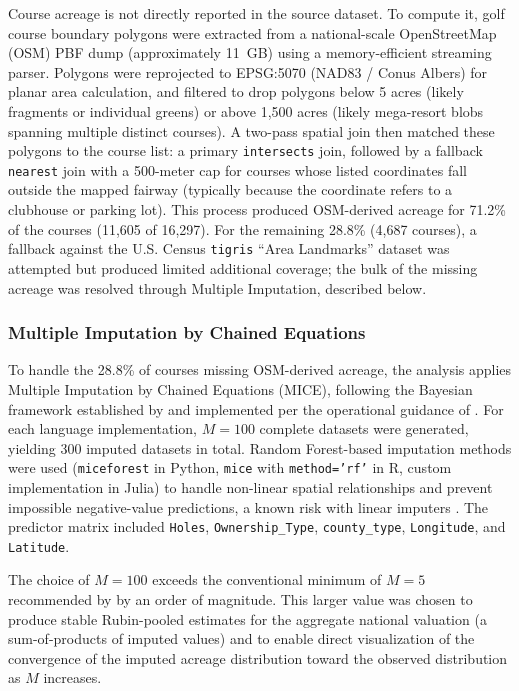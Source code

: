 \documentclass[11pt, letterpaper]{article}
\begin{document}
Course acreage is not directly reported in the source dataset. To compute it, golf course boundary polygons were extracted from a national-scale OpenStreetMap (OSM) PBF dump (approximately 11~GB) using a memory-efficient streaming parser. Polygons were reprojected to EPSG:5070 (NAD83 / Conus Albers) for planar area calculation, and filtered to drop polygons below 5 acres (likely fragments or individual greens) or above 1,500 acres (likely mega-resort blobs spanning multiple distinct courses). A two-pass spatial join then matched these polygons to the course list: a primary \texttt{intersects} join, followed by a fallback \texttt{nearest} join with a 500-meter cap for courses whose listed coordinates fall outside the mapped fairway (typically because the coordinate refers to a clubhouse or parking lot). This process produced OSM-derived acreage for 71.2\% of the courses (11,605 of 16,297). For the remaining 28.8\% (4,687 courses), a fallback against the U.S. Census \texttt{tigris} ``Area Landmarks'' dataset was attempted but produced limited additional coverage; the bulk of the missing acreage was resolved through Multiple Imputation, described below.

\subsubsection{Multiple Imputation by Chained Equations}

To handle the 28.8\% of courses missing OSM-derived acreage, the analysis applies Multiple Imputation by Chained Equations (MICE), following the Bayesian framework established by \textcite{Rubin1987} and implemented per the operational guidance of \textcite{Burren2018}. For each language implementation, $M = 100$ complete datasets were generated, yielding 300 imputed datasets in total. Random Forest-based imputation methods were used (\texttt{miceforest} in Python, \texttt{mice} with \texttt{method='rf'} in R, custom implementation in Julia) to handle non-linear spatial relationships and prevent impossible negative-value predictions, a known risk with linear imputers \parencite{Burren2018}. The predictor matrix included \texttt{Holes}, \texttt{Ownership\_Type}, \texttt{county\_type}, \texttt{Longitude}, and \texttt{Latitude}.

The choice of $M = 100$ exceeds the conventional minimum of $M = 5$ recommended by \textcite{Rubin1987} by an order of magnitude. This larger value was chosen to produce stable Rubin-pooled estimates for the aggregate national valuation (a sum-of-products of imputed values) and to enable direct visualization of the convergence of the imputed acreage distribution toward the observed distribution as $M$ increases.
\end{document}
